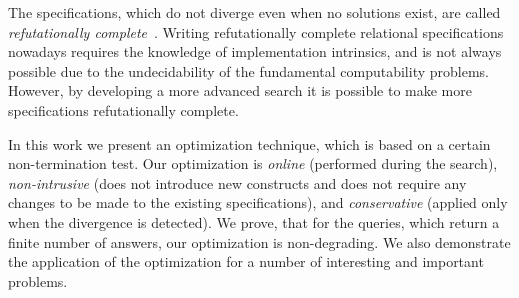 The specifications, which do not diverge even when no solutions exist, are called \emph{refutationally complete}~\cite{WillThesis}. Writing 
refutationally complete relational specifications nowadays requires the knowledge of \miniKanren implementation intrinsics, and is not always
possible due to the undecidability of the fundamental computability problems. However, by developing a more advanced search it is possible
to make more specifications refutationally complete.

In this work we present an optimization technique, which is based on a certain non-termination test. Our optimization is \emph{online} (performed during the
search), \emph{non-intrusive} (does not introduce new constructs and does not require any changes to be made to the existing specifications), and \emph{conservative} 
(applied only when the divergence is detected). We prove, that for the queries, which return a finite number of answers, our optimization is non-degrading. 
We also demonstrate the application of the optimization for a number of interesting and important problems.
